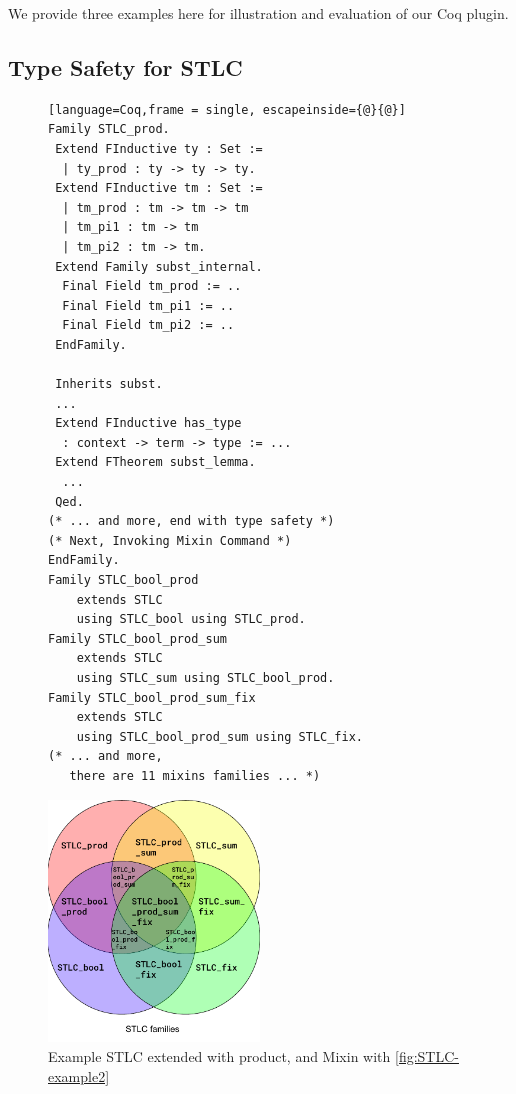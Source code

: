 \newpage{}
We provide three examples here for illustration and evaluation of our Coq plugin. 

\subsection{Type Safety for STLC}

\begin{figure}
\begin{lstlisting}[language=Coq,frame = single, escapeinside={@}{@}]
Family STLC_prod.
 Extend FInductive ty : Set :=
  | ty_prod : ty -> ty -> ty.
 Extend FInductive tm : Set :=
  | tm_prod : tm -> tm -> tm  
  | tm_pi1 : tm -> tm  
  | tm_pi2 : tm -> tm.
 Extend Family subst_internal.
  Final Field tm_prod := ..
  Final Field tm_pi1 := ..
  Final Field tm_pi2 := ..
 EndFamily.

 Inherits subst.
 ...
 Extend FInductive has_type 
  : context -> term -> type := ...
 Extend FTheorem subst_lemma.
  ... 
 Qed.
(* ... and more, end with type safety *)
(* Next, Invoking Mixin Command *)
EndFamily.
Family STLC_bool_prod 
    extends STLC 
    using STLC_bool using STLC_prod.
Family STLC_bool_prod_sum 
    extends STLC 
    using STLC_sum using STLC_bool_prod.
Family STLC_bool_prod_sum_fix 
    extends STLC 
    using STLC_bool_prod_sum using STLC_fix.
(* ... and more, 
   there are 11 mixins families ... *)
\end{lstlisting}
\includegraphics[width=0.5\textwidth]{coqexmaple/Mixin-Venn-Diagram.pdf}
\caption{Example STLC extended with product, and Mixin with \cref{fig:STLC-example2}}
\end{figure}

